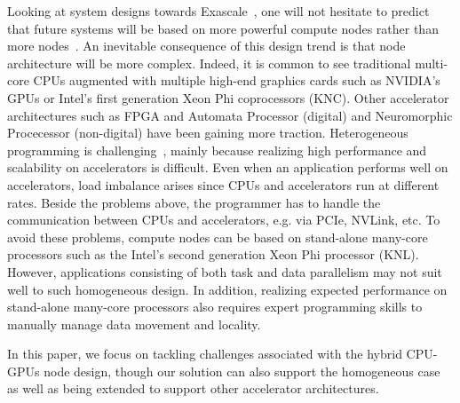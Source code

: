 Looking at system designs towards Exascale~\cite{top500}, one will not hesitate to predict that future systems will be based on more powerful compute nodes rather than more nodes~\cite{Shalf:exascaleChallenges}.  
An inevitable consequence of this design trend is that node architecture will be more complex.
Indeed, it is common to see traditional multi-core CPUs augmented with multiple high-end graphics cards such as NVIDIA's GPUs or Intel's first generation Xeon Phi coprocessors (KNC).
Other accelerator architectures such as FPGA and Automata Processor (digital) and Neuromorphic Procecessor (non-digital) have been gaining more traction.
Heterogeneous programming is challenging~\cite{exascaleRoadMap}, mainly because realizing high performance and scalability on accelerators is difficult.
Even when an application performs well on accelerators, load imbalance arises since CPUs and accelerators run at different rates.
Beside the problems above, the programmer has to handle the communication between CPUs and accelerators, e.g. via PCIe, NVLink, etc.
To avoid these problems, compute nodes can be based on stand-alone many-core processors such as the Intel's second generation Xeon Phi processor (KNL).
However, applications consisting of both task and data parallelism may not suit well to such homogeneous design.
In addition, realizing expected performance on stand-alone many-core processors also requires expert programming skills
to manually manage data movement and locality.





In this paper, we focus on tackling challenges associated with the hybrid CPU-GPUs node design, though our solution can also support the homogeneous case as well as being extended to support other accelerator architectures.
